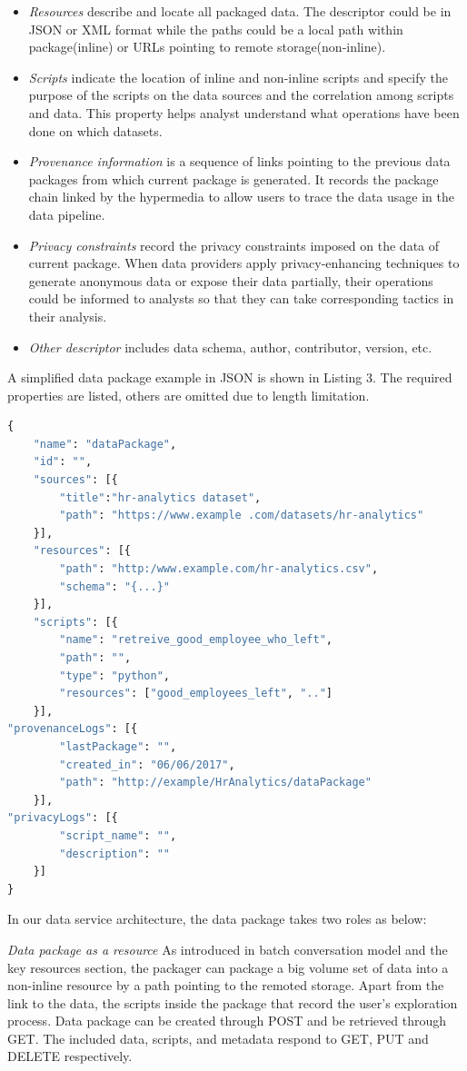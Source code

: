 \documentclass[10pt, conference, compsocconf]{IEEEtran}
\begin{document}
\begin{itemize}
	\item \textit{Resources} describe and locate all packaged data. The descriptor could be in JSON or XML format while the paths could be a local path within package(inline) or URLs pointing to remote storage(non-inline). 
	\item \textit{Scripts} indicate the location of inline and non-inline scripts and specify the purpose of the scripts on the data sources and the correlation among scripts and data. This property helps analyst understand what operations have been done on which datasets.
	\item \textit{Provenance information} is a sequence of links pointing to the previous data packages from which current package is generated. It records the package chain linked by the hypermedia to allow users to trace the data usage in the data pipeline. 
	\item \textit{Privacy constraints} record the privacy constraints imposed on the data of current package. When data providers apply privacy-enhancing techniques to generate anonymous data or expose their data partially, their operations could be informed to analysts so that they can take corresponding tactics in their analysis.
	\item \textit{Other descriptor} includes data schema, author, contributor, version, etc. 
\end{itemize}	

A simplified data package example in JSON is shown in Listing 3. The required properties are listed, others are omitted due to length limitation.
\begin{lstlisting}[language=python, caption=A Data Package Example]
{
	"name": "dataPackage",
	"id": "",
	"sources": [{
		"title":"hr-analytics dataset",
		"path": "https://www.example .com/datasets/hr-analytics"
	}],
	"resources": [{
		"path": "http:/www.example.com/hr-analytics.csv",
		"schema": "{...}"
	}],
	"scripts": [{
		"name": "retreive_good_employee_who_left",
		"path": "",
		"type": "python",
		"resources": ["good_employees_left", ".."]
	}],
"provenanceLogs": [{
		"lastPackage": "",
		"created_in": "06/06/2017",
		"path": "http://example/HrAnalytics/dataPackage"
	}],
"privacyLogs": [{
		"script_name": "",
		"description": ""
	}]
}
\end{lstlisting}

In our data service architecture, the data package takes two roles as below:

\textit{Data package as a resource} As introduced in batch conversation model and the key resources section, the packager can package a big volume set of data into a non-inline resource by a path pointing to the remoted storage. Apart from the link to the data, the scripts inside the package that record the user’s exploration process. Data package can be created through POST and be retrieved through GET. The included data, scripts, and metadata respond to GET, PUT and DELETE respectively.
\end{document}
